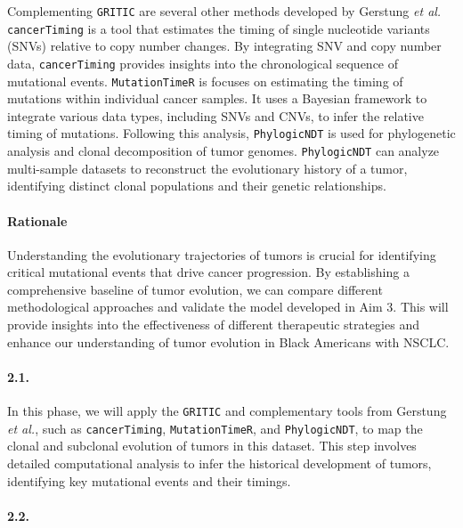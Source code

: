 \vspace{1em}
\noindent
Complementing \texttt{GRITIC} are several other methods developed by Gerstung \textit{et al.} 
\texttt{cancerTiming} is a tool that estimates the timing of single nucleotide variants (SNVs) relative to copy number changes. 
By integrating SNV and copy number data, \texttt{cancerTiming} provides insights into the chronological sequence of mutational events.
\texttt{MutationTimeR} is focuses on estimating the timing of mutations within individual cancer samples. 
It uses a Bayesian framework to integrate various data types, including SNVs and CNVs, to infer the relative timing of mutations.
Following this analysis, \texttt{PhylogicNDT} is used for phylogenetic analysis and clonal decomposition of tumor genomes.
\texttt{PhylogicNDT} can analyze multi-sample datasets to reconstruct the evolutionary history of a tumor, 
identifying distinct clonal populations and their genetic relationships.
 

\paragraph{Rationale}

Understanding the evolutionary trajectories of tumors is crucial for identifying critical mutational events that drive cancer progression. 
By establishing a comprehensive baseline of tumor evolution, we can compare different methodological approaches and validate the model developed in Aim 3. 
This will provide insights into the effectiveness of different therapeutic strategies and enhance our understanding of tumor evolution in Black Americans with NSCLC.

\paragraph{2.1. \SpecificAimTwoA}

In this phase, we will apply the \texttt{GRITIC} and complementary tools from Gerstung \textit{et al.}, 
such as \texttt{cancerTiming}, \texttt{MutationTimeR}, and \texttt{PhylogicNDT}, 
to map the clonal and subclonal evolution of tumors in this dataset. 
This step involves detailed computational analysis to infer the historical development of tumors, 
identifying key mutational events and their timings.

\paragraph{2.2. \SpecificAimTwoB}

